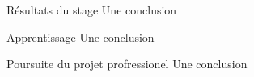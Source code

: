 \begin{frame}{Résultats du stage}
    Une conclusion
\end{frame}

\begin{frame}{Apprentissage}
    Une conclusion
\end{frame}

\begin{frame}{Poursuite du projet profressionel}
    Une conclusion
\end{frame}